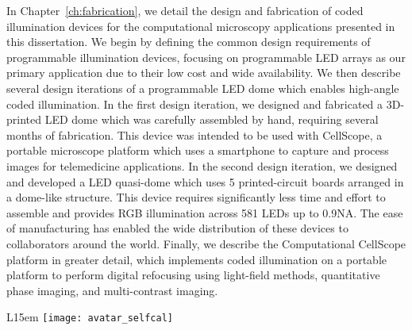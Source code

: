 In Chapter~\ref{ch:fabrication}, we detail the design and fabrication of coded illumination devices for the computational microscopy applications presented in this dissertation. We begin by defining the common design requirements of programmable illumination devices, focusing on programmable LED arrays as our primary application due to their low cost and wide availability. We then describe several design iterations of a programmable LED dome which enables high-angle coded illumination. In the first design iteration, we designed and fabricated a 3D-printed LED dome which was carefully assembled by hand, requiring several months of fabrication. This device was intended to be used with CellScope, a portable microscope platform which uses a smartphone to capture and process images for telemedicine applications. In the second design iteration, we designed and developed a LED quasi-dome which uses 5 printed-circuit boards arranged in a dome-like structure. This device requires significantly less time and effort to assemble and provides RGB illumination across 581 LEDs up to 0.9NA. The ease of manufacturing has enabled the wide distribution of these devices to collaborators around the world. Finally, we describe the Computational CellScope platform in greater detail, which implements coded illumination on a portable platform to perform digital refocusing using light-field methods, quantitative phase imaging, and multi-contrast imaging.


\begin{wrapfigure}{L}{15em}
  \texttt{[image: avatar\_selfcal]}
\end{wrapfigure}


